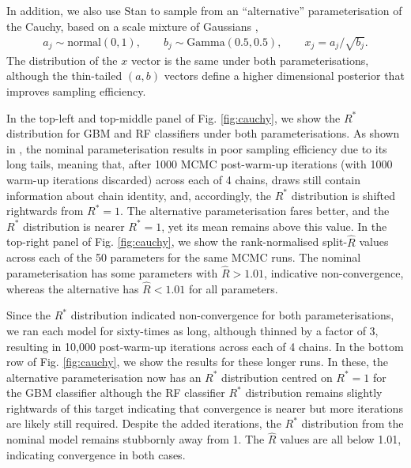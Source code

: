 \documentclass[ba]{imsart}
\numberwithin{equation}{section}
\theoremstyle{plain}
\begin{document}
In addition, we also use Stan to sample from an ``alternative'' parameterisation of the Cauchy, based on a scale mixture of Gaussians \citep{vehtari2019rank},
%
\begin{align}
a_j \sim  \text{normal}(0,1), \qquad
b_j \sim  \text{Gamma}(0.5, 0.5), \qquad
x_j =  a_j/\sqrt{b_j}.
\end{align}
%
The distribution of the $x$ vector is the same under both parameterisations, although the thin-tailed $(a,b)$ vectors define a higher dimensional posterior that improves sampling efficiency.

In the top-left and top-middle panel of Fig. \ref{fig:cauchy}, we show the $R^*$ distribution for GBM and RF classifiers under both parameterisations. As shown in \cite{vehtari2019rank}, the nominal parameterisation results in poor sampling efficiency due to its long tails, meaning that, after 1000 MCMC post-warm-up iterations (with 1000 warm-up iterations discarded) across each of 4 chains, draws still contain information about chain identity, and, accordingly, the $R^*$ distribution is shifted rightwards from $R^*=1$. The alternative parameterisation fares better, and the $R^*$ distribution is nearer $R^*=1$, yet its mean remains above this value. In the top-right panel of Fig. \ref{fig:cauchy}, we show the rank-normalised split-$\widehat{R}$ values across each of the 50 parameters for the same MCMC runs. The nominal parameterisation has some parameters with $\widehat{R}>1.01$, indicative non-convergence, whereas the alternative has $\widehat{R}<1.01$ for all parameters.

Since the $R^*$ distribution indicated non-convergence for both parameterisations, we ran each model for sixty-times as long, although thinned by a factor of 3, resulting in 10,000 post-warm-up iterations across each of 4 chains. In the bottom row of Fig. \ref{fig:cauchy}, we show the results for these longer runs. In these, the alternative parameterisation now has an $R^*$ distribution centred on $R^*=1$ for the GBM classifier although the RF classifier $R^*$ distribution remains slightly rightwards of this target indicating that convergence is nearer but more iterations are likely still required. Despite the added iterations, the $R^*$ distribution from the nominal model remains stubbornly away from 1. The $\widehat{R}$ values are all below 1.01, indicating convergence in both cases.
\end{document}
